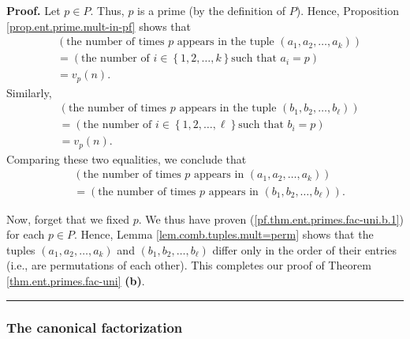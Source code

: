 \documentclass[numbers=enddot,12pt,final,onecolumn,notitlepage]{scrartcl}%
\numberwithin{exer}{subsection}
\theoremstyle{definition}
\newenvironment{proof}[1][Proof]{\noindent\textbf{#1.} }{\ \rule{0.5em}{0.5em}}
\begin{document}
\begin{proof}
Let $p\in P$. Thus, $p$ is a prime (by the definition of $P$). Hence,
Proposition \ref{prop.ent.prime.mult-in-pf} shows that%
\begin{align*}
&  \left(  \text{the number of times }p\text{ appears in the tuple }\left(
a_{1},a_{2},\ldots,a_{k}\right)  \right) \\
&  =\left(  \text{the number of }i\in\left\{  1,2,\ldots,k\right\}  \text{
such that }a_{i}=p\right) \\
&  =v_{p}\left(  n\right)  .
\end{align*}
Similarly,%
\begin{align*}
&  \left(  \text{the number of times }p\text{ appears in the tuple }\left(
b_{1},b_{2},\ldots,b_{\ell}\right)  \right) \\
&  =\left(  \text{the number of }i\in\left\{  1,2,\ldots,\ell\right\}  \text{
such that }b_{i}=p\right) \\
&  =v_{p}\left(  n\right)  .
\end{align*}
Comparing these two equalities, we conclude that
\begin{align}
&  \left(  \text{the number of times }p\text{ appears in }\left(  a_{1}%
,a_{2},\ldots,a_{k}\right)  \right) \nonumber\\
&  =\left(  \text{the number of times }p\text{ appears in }\left(  b_{1}%
,b_{2},\ldots,b_{\ell}\right)  \right)  .
\label{pf.thm.ent.primes.fac-uni.b.1}%
\end{align}


Now, forget that we fixed $p$. We thus have proven
(\ref{pf.thm.ent.primes.fac-uni.b.1}) for each $p\in P$. Hence, Lemma
\ref{lem.comb.tuples.mult=perm} shows that the tuples $\left(  a_{1}%
,a_{2},\ldots,a_{k}\right)  $ and $\left(  b_{1},b_{2},\ldots,b_{\ell}\right)
$ differ only in the order of their entries (i.e., are permutations of each
other). This completes our proof of Theorem \ref{thm.ent.primes.fac-uni}
\textbf{(b)}.
\end{proof}

\subsubsection{The canonical factorization}
\end{document}
